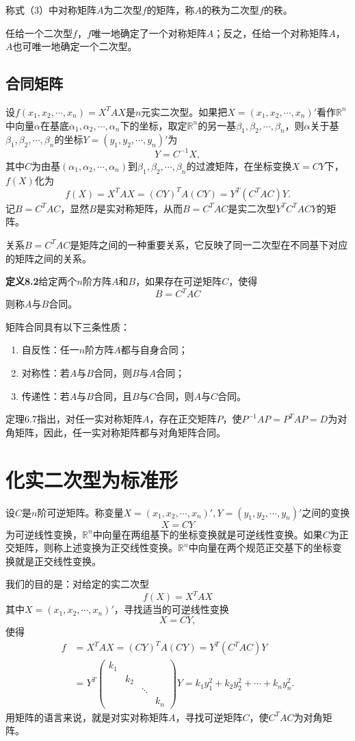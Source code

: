 称式（3）中对称矩阵$A$为二次型$f$的矩阵，称$A$的秩为二次型$f$的秩。

任给一个二次型$f$，$f$唯一地确定了一个对称矩阵$A$；反之，任给一个对称矩阵$A$，$A$也可唯一地确定一个二次型。

\subsection{合同矩阵}
设$f(x_1,x_2,\cdots,x_n)=X^TAX$是$n$元实二次型。如果把$X=(x_1,x_2,\cdots,x_n)'$看作$\mathbb{R}^n$中向量$\alpha$在基底$\alpha_1,\alpha_2,\cdots,\alpha_n$下的坐标，取定$\mathbb{R}^n$的另一基$\beta_1,\beta_2,\cdots,\beta_n$，则$\alpha$关于基$\beta_1,\beta_2,\cdots,\beta_n$的坐标$Y=(y_1,y_2,\cdots,y_n)'$为
\[
Y=C^{-1}X,
\]
其中$C$为由基$(\alpha_1,\alpha_2,\cdots,\alpha_n)$到$\beta_1,\beta_2,\cdots,\beta_n$的过渡矩阵，在坐标变换$X=CY$下，$f(X)$化为
\[
f(X)=X^TAX=(CY)^TA(CY)=Y^T(C^TAC)Y.
\]
记$B=C^TAC$，显然$B$是实对称矩阵，从而$B=C^TAC$是实二次型$Y^TC^TACY$的矩阵。

关系$B=C^TAC$是矩阵之间的一种重要关系，它反映了同一二次型在不同基下对应的矩阵之间的关系。

\textbf{定义8.2}\quad 给定两个$n$阶方阵$A$和$B$，如果存在可逆矩阵$C$，使得
\[
B=C^TAC
\]
则称$A$与$B$合同。

矩阵合同具有以下三条性质：
\begin{enumerate}
    \item 自反性：任一$n$阶方阵$A$都与自身合同；
    \item 对称性：若$A$与$B$合同，则$B$与$A$合同；
    \item 传递性：若$A$与$B$合同，且$B$与$C$合同，则$A$与$C$合同。
\end{enumerate}

定理6.7指出，对任一实对称矩阵$A$，存在正交矩阵$P$，使$P^{-1}AP=P^TAP=D$为对角矩阵，因此，任一实对称矩阵都与对角矩阵合同。

\section{化实二次型为标准形}
设$C$是$n$阶可逆矩阵。称变量$X=(x_1,x_2,\cdots,x_n)',Y=(y_1,y_2,\cdots,y_n)'$之间的变换
\[
X=CY
\]
为可逆线性变换，$\mathbb{R}^n$中向量在两组基下的坐标变换就是可逆线性变换。如果$C$为正交矩阵，则称上述变换为正交线性变换。$\mathbb{R}^n$中向量在两个规范正交基下的坐标变换就是正交线性变换。

我们的目的是：对给定的实二次型
\[
f(X)=X^TAX
\]
其中$X=(x_1,x_2,\cdots,x_n)'$，寻找适当的可逆线性变换
\[
X=CY,
\]
使得
\[
\begin{aligned}
f&=X^TAX=(CY)^TA(CY)=Y^T(C^TAC)Y \\
&= Y^T
\begin{pmatrix}
k_1 & & & \\
& k_2 & & \\
& & \ddots & \\
& & & k_n
\end{pmatrix}
Y
= k_1 y_1^2 + k_2 y_2^2 + \cdots + k_n y_n^2.
\end{aligned}
\]
用矩阵的语言来说，就是对实对称矩阵$A$，寻找可逆矩阵$C$，使$C^TAC$为对角矩阵。

